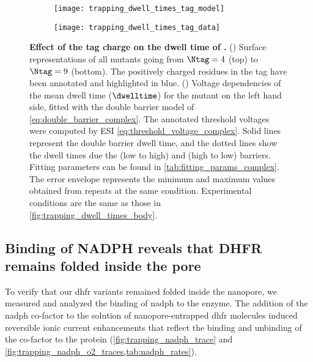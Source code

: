 %
\begin{figure*}[p]
  \centering

	\begin{subfigure}[t]{4.5cm}
		\centering
		\caption{}\vspace{-5mm}\label{fig:trapping_dwell_times_tag_model}
    \texttt{[image: trapping\_dwell\_times\_tag\_model]}
  \end{subfigure}
  \begin{subfigure}[t]{6.5cm}
		\centering
		\caption{}\vspace{-3mm}\label{fig:trapping_dwell_times_tag_data}
    \texttt{[image: trapping\_dwell\_times\_tag\_data]}
  \end{subfigure}

	\caption[Effect of the tag charge on the dwell time of ]{%
    \textbf{Effect of the tag charge on the dwell time of .}
    ()
    Surface representations of all  mutants going from $\Ntag=4$ (top) to $\Ntag=9$
    (bottom). The positively charged residues in the tag have been annotated and highlighted in blue.
    ()
    Voltage dependencies of the mean dwell time ($\dwelltime$) for the mutant on the left hand side, fitted
    with the double barrier model of \cref{eq:double_barrier_complex}. The annotated threshold voltages were
    computed by ESI \cref{eq:threshold_voltage_complex}. Solid lines represent the double barrier dwell time,
    and the dotted lines show the dwell times due the \cisi{} (low to high) and \transi{} (high to low)
    barriers. Fitting parameters can be found in \cref{tab:fitting_params_complex}. The error envelope
    represents the minimum and maximum values obtained from repeats at the same condition. Experimental
    conditions are the same as those in \cref{fig:trapping_dwell_times_body}.
  }\label{fig:trapping_dwell_times_tag}
\end{figure*}
%

\subsection{Binding of {NADPH} reveals that {DHFR} remains folded inside the pore}
%

To verify that our \gls{dhfr} variants remained folded inside the nanopore, we measured and analyzed the
binding of \gls{nadph} to the enzyme. The addition of the \gls{nadph} co-factor to the \transi{} solution of
nanopore-entrapped \gls{dhfr} molecules induced reversible ionic current enhancements that reflect the binding
and unbinding of the co-factor to the protein (\cref{fig:trapping_nadph_trace} and
\cref{fig:trapping_nadph_o2_traces,tab:nadph_rates}).

